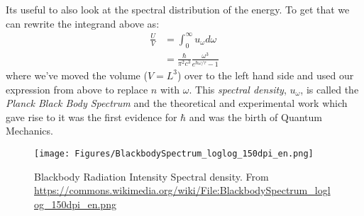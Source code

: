 Its useful to also look at the spectral distribution of the energy. To get that
we can rewrite the integrand above as:
\begin{align}
\frac{U}{V} &= \int_{0}^{\infty} u_{\omega} d\omega \\
	        &= \frac{\hbar}{\pi^2 c^3} \frac{\omega^3}{e^{\hbar \omega/\tau} - 1}
\end{align}
where we've moved the volume ($V = L^3$) over to the left hand side and used
our expression from above to replace $n$ with $\omega$. This
\textit{spectral density}, $u_{\omega}$, is called the
\emph{Planck Black Body Spectrum} and the theoretical and experimental work which
gave rise to it was the first evidence for $\hbar$ and was the birth of
Quantum Mechanics.

\begin{figure}[ht]
\centering
\texttt{[image: Figures/BlackbodySpectrum\_loglog\_150dpi\_en.png]}
\caption{Blackbody Radiation Intensity Spectral density. From 
	\url{https://commons.wikimedia.org/wiki/File:BlackbodySpectrum_loglog_150dpi_en.png}}
\end{figure}
